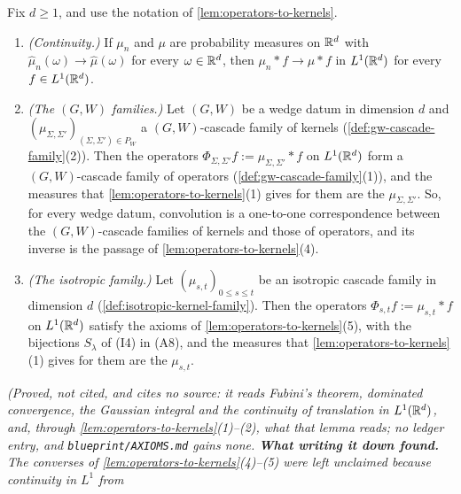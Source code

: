 \begin{lemma}
\label{lem:kernels-to-operators}
\leanok
Fix $d \ge 1$, and use the notation of \ref{lem:operators-to-kernels}.
\begin{enumerate}
\item \emph{(Continuity.)} If $\mu_n$ and $\mu$ are probability measures on $\mathbb{R}^d$ with
$\widehat\mu_n(\omega) \to \widehat\mu(\omega)$ for every $\omega \in \mathbb{R}^d$, then
$\mu_n * f \to \mu * f$ in $L^1(\mathbb{R}^d)$ for every $f \in L^1(\mathbb{R}^d)$.
\item \emph{(The $(G, W)$ families.)} Let $(G, W)$ be a wedge datum in dimension $d$ and
$(\mu_{\Sigma,\Sigma'})_{(\Sigma,\Sigma') \in P_W}$ a $(G, W)$-cascade family of kernels
(\ref{def:gw-cascade-family}(2)). Then the operators $\Phi_{\Sigma,\Sigma'}f := \mu_{\Sigma,\Sigma'} * f$
on $L^1(\mathbb{R}^d)$ form a $(G, W)$-cascade family of operators (\ref{def:gw-cascade-family}(1)), and the
measures that \ref{lem:operators-to-kernels}(1) gives for them are the $\mu_{\Sigma,\Sigma'}$. So, for
every wedge datum, convolution is a one-to-one correspondence between the $(G, W)$-cascade families of
kernels and those of operators, and its inverse is the passage of
\ref{lem:operators-to-kernels}(4).
\item \emph{(The isotropic family.)} Let $(\mu_{s,t})_{0 \le s \le t}$ be an isotropic cascade family
in dimension $d$ (\ref{def:isotropic-kernel-family}). Then the operators $\Phi_{s,t}f := \mu_{s,t} * f$
on $L^1(\mathbb{R}^d)$ satisfy the axioms of \ref{lem:operators-to-kernels}(5), with the bijections
$S_\lambda$ of (I4) in (A8), and the measures that \ref{lem:operators-to-kernels}(1) gives for them are
the $\mu_{s,t}$.
\end{enumerate}
\statusT\quad\emph{(Proved, not cited, and cites no source: it reads Fubini's theorem, dominated
convergence, the Gaussian integral and the continuity of translation in $L^1(\mathbb{R}^d)$, and, through
\ref{lem:operators-to-kernels}(1)--(2), what that lemma reads; no ledger entry, and
\texttt{blueprint/AXIOMS.md} gains none. \textbf{What writing it down found.} The converses of
\ref{lem:operators-to-kernels}(4)--(5) were left unclaimed because continuity in $L^1$ from
}
\end{lemma}
